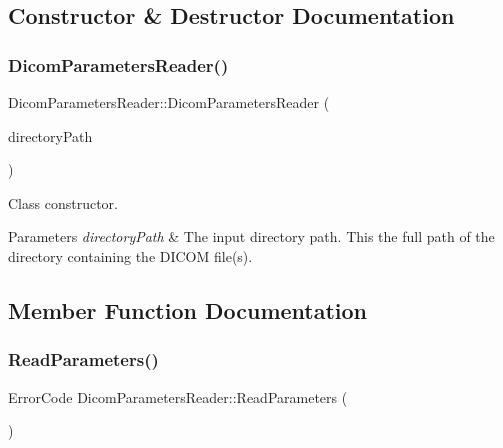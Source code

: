 \subsection{Constructor \& Destructor Documentation}
\mbox{\label{class_dicom_parameters_reader_a5d2aff3c73d3ccd3cce88dd4bec78615}} 
\subsubsection{\texorpdfstring{Dicom\+Parameters\+Reader()}{DicomParametersReader()}}
{\footnotesize\ttfamily Dicom\+Parameters\+Reader\+::\+Dicom\+Parameters\+Reader (\begin{DoxyParamCaption}\item[{const Q\+String \&}]{directory\+Path }\end{DoxyParamCaption})\hspace{0.3cm}{\ttfamily [explicit]}}



Class constructor. 


\begin{DoxyParams}{Parameters}
{\em directory\+Path} & The input directory path. This the full path of the directory containing the D\+I\+C\+OM file(s). \\
\hline
\end{DoxyParams}


\subsection{Member Function Documentation}
\mbox{\label{class_dicom_parameters_reader_a7f324d9d7f529d513148bed8dc85691a}} 
\subsubsection{\texorpdfstring{Read\+Parameters()}{ReadParameters()}}
{\footnotesize\ttfamily Error\+Code Dicom\+Parameters\+Reader\+::\+Read\+Parameters (\begin{DoxyParamCaption}{ }\end{DoxyParamCaption})}



